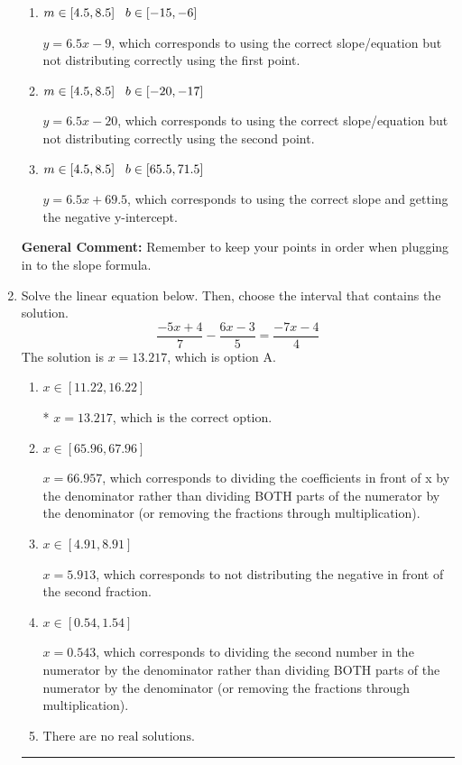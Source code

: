 \documentclass{extbook}[14pt]
\newcommand{\litem}[1]{\item #1

\rule{\textwidth}{0.4pt}}
\begin{document}
\begin{enumerate}
{\begin{enumerate}[label=\Alph*.]
 $y = -6.5x + 47.5$, which corresponds to using the negative slope and the correct equation.
\item \( m \in [4.5, 8.5] \hspace*{3mm} b \in [-15, -6] \)

 $y = 6.5x -9$, which corresponds to using the correct slope/equation but not distributing correctly using the first point.
\item \( m \in [4.5, 8.5] \hspace*{3mm} b \in [-20, -17] \)

 $y = 6.5x -20$, which corresponds to using the correct slope/equation but not distributing correctly using the second point.
\item \( m \in [4.5, 8.5] \hspace*{3mm} b \in [65.5, 71.5] \)

 $y = 6.5x + 69.5$, which corresponds to using the correct slope and getting the negative y-intercept.
\end{enumerate}

\textbf{General Comment:} Remember to keep your points in order when plugging in to the slope formula.
}
\litem{
Solve the linear equation below. Then, choose the interval that contains the solution.
\[ \frac{-5x + 4}{7} - \frac{6x -3}{5} = \frac{-7x -4}{4} \]The solution is \( x = 13.217 \), which is option A.\begin{enumerate}[label=\Alph*.]
\item \( x \in [11.22, 16.22] \)

* $x = 13.217$, which is the correct option.
\item \( x \in [65.96, 67.96] \)

 $x = 66.957$, which corresponds to dividing the coefficients in front of x by the denominator rather than dividing BOTH parts of the numerator by the denominator (or removing the fractions through multiplication).
\item \( x \in [4.91, 8.91] \)

 $x = 5.913$, which corresponds to not distributing the negative in front of the second fraction.
\item \( x \in [0.54, 1.54] \)

 $x = 0.543$, which corresponds to dividing the second number in the numerator by the denominator rather than dividing BOTH parts of the numerator by the denominator (or removing the fractions through multiplication).
\item \( \text{There are no real solutions.} \)


\end{enumerate}}
\end{enumerate}
\end{document}

